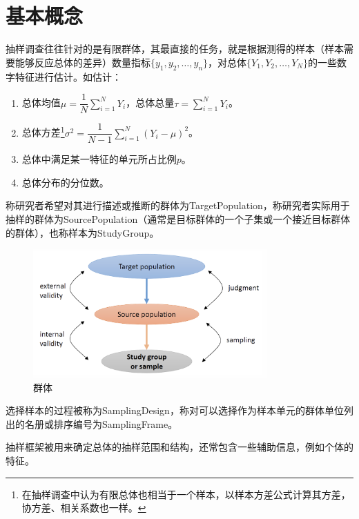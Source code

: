 \section{基本概念}
抽样调查往往针对的是有限群体，其最直接的任务，就是根据测得的样本（样本需要能够反应总体的差异）数量指标$\{y_1,y_2,\dots,y_n\}$，对总体$\{Y_1,Y_2,\dots,Y_N\}$的一些数字特征进行估计。如估计：
\begin{enumerate}
	\item 总体均值$\mu=\dfrac{1}{N}\sum\limits_{i=1}^NY_i$，总体总量$\tau=\sum\limits_{i=1}^NY_i$。
	\item 总体方差\footnote{在抽样调查中认为有限总体也相当于一个样本，以样本方差公式计算其方差，协方差、相关系数也一样。}$\sigma^2=\dfrac{1}{N-1}\sum\limits_{i=1}^N(Y_i-\mu)^2$。
	\item 总体中满足某一特征的单元所占比例$p$。
	\item 总体分布的分位数。
\end{enumerate}
\begin{definition}
	称研究者希望对其进行描述或推断的群体为\gls{TargetPopulation}，称研究者实际用于抽样的群体为\gls{SourcePopulation}（通常是目标群体的一个子集或一个接近目标群体的群体），也称样本为\gls{StudyGroup}。
\end{definition}
\begin{figure}[htbp] 
	\centering 
	\includegraphics[width=0.8\textwidth]{statistics/sampling-method/population.png}
	\caption{群体} 
\end{figure}
\begin{definition}
	选择样本的过程被称为\gls{SamplingDesign}，称对可以选择作为样本单元的群体单位列出的名册或排序编号为\gls{SamplingFrame}。
\end{definition}
\begin{note}
	抽样框架被用来确定总体的抽样范围和结构，还常包含一些辅助信息，例如个体的特征。
\end{note}
